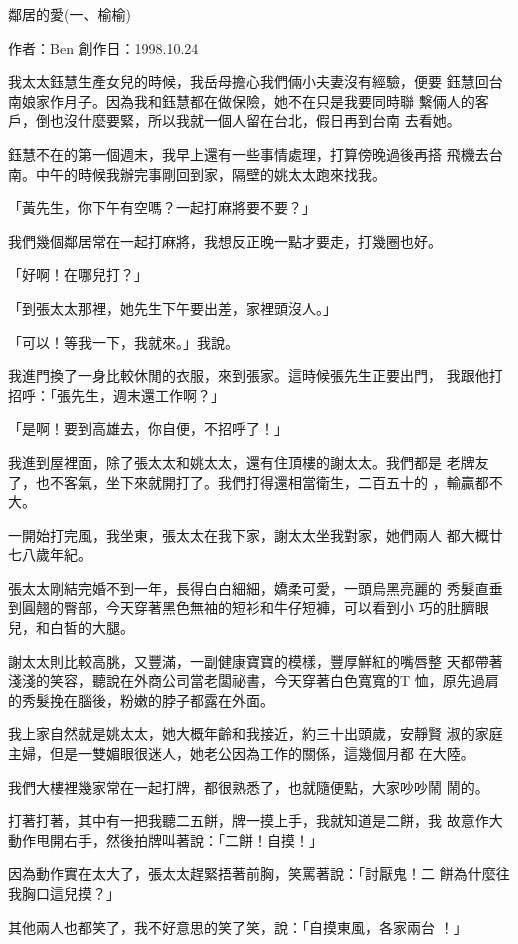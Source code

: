 鄰居的愛(一、榆榆)

作者：Ben
創作日：1998.10.24

我太太鈺慧生產女兒的時候，我岳母擔心我們倆小夫妻沒有經驗，便要
鈺慧回台南娘家作月子。因為我和鈺慧都在做保險，她不在只是我要同時聯
繫倆人的客戶，倒也沒什麼要緊，所以我就一個人留在台北，假日再到台南
去看她。

鈺慧不在的第一個週末，我早上還有一些事情處理，打算傍晚過後再搭
飛機去台南。中午的時候我辦完事剛回到家，隔壁的姚太太跑來找我。

「黃先生，你下午有空嗎？一起打麻將要不要？」

我們幾個鄰居常在一起打麻將，我想反正晚一點才要走，打幾圈也好。

「好啊！在哪兒打？」

「到張太太那裡，她先生下午要出差，家裡頭沒人。」

「可以！等我一下，我就來。」我說。

我進門換了一身比較休閒的衣服，來到張家。這時候張先生正要出門，
我跟他打招呼：「張先生，週末還工作啊？」

「是啊！要到高雄去，你自便，不招呼了！」

我進到屋裡面，除了張太太和姚太太，還有住頂樓的謝太太。我們都是
老牌友了，也不客氣，坐下來就開打了。我們打得還相當衛生，二百五十的
，輸贏都不大。

一開始打完風，我坐東，張太太在我下家，謝太太坐我對家，她們兩人
都大概廿七八歲年紀。

張太太剛結完婚不到一年，長得白白細細，嬌柔可愛，一頭烏黑亮麗的
秀髮直垂到圓翹的臀部，今天穿著黑色無袖的短衫和牛仔短褲，可以看到小
巧的肚臍眼兒，和白皙的大腿。

謝太太則比較高朓，又豐滿，一副健康寶寶的模樣，豐厚鮮紅的嘴唇整
天都帶著淺淺的笑容，聽說在外商公司當老闆祕書，今天穿著白色寬寬的T
恤，原先過肩的秀髮挽在腦後，粉嫩的脖子都露在外面。

我上家自然就是姚太太，她大概年齡和我接近，約三十出頭歲，安靜賢
淑的家庭主婦，但是一雙媚眼很迷人，她老公因為工作的關係，這幾個月都
在大陸。

我們大樓裡幾家常在一起打牌，都很熟悉了，也就隨便點，大家吵吵鬧
鬧的。

打著打著，其中有一把我聽二五餅，牌一摸上手，我就知道是二餅，我
故意作大動作甩開右手，然後拍牌叫著說：「二餅！自摸！」

因為動作實在太大了，張太太趕緊捂著前胸，笑罵著說：「討厭鬼！二
餅為什麼往我胸口這兒摸？」

其他兩人也都笑了，我不好意思的笑了笑，說：「自摸東風，各家兩台
！」

